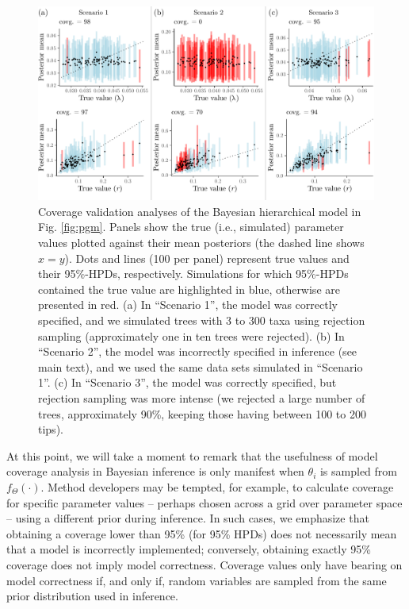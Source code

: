 \documentclass[oneside]{article}
\begin{document}
\begin{figure}
  \includegraphics[width=\textwidth]{../figures/graphical_model_coverage.pdf}
  \caption{
    Coverage validation analyses of the Bayesian hierarchical model in Fig. \ref{fig:pgm}.
    Panels show the true (i.e., simulated) parameter values plotted against their mean posteriors (the dashed line shows $x = y$).
    Dots and lines (100 per panel) represent true values and their 95\%-HPDs, respectively.
    Simulations for which 95\%-HPDs contained the true value are highlighted in blue, otherwise are presented in red.
    (a) In ``Scenario 1'', the model was correctly specified, and we simulated trees with 3 to 300 taxa using rejection sampling (approximately one in ten trees were rejected).
    (b) In ``Scenario 2'', the model was incorrectly specified in inference (see main text), and we used the same data sets simulated in ``Scenario 1''.
    (c) In ``Scenario 3'', the model was correctly specified, but rejection sampling was more intense (we rejected a large number of trees, approximately 90\%, keeping those having between 100 to 200 tips).
  }
  \label{fig:yulecalval}
\end{figure}

At this point, we will take a moment to remark that the usefulness of model coverage analysis in Bayesian inference is only manifest when $\theta_i$ is sampled from $f_\Theta(\cdot)$.
Method developers may be tempted, for example, to calculate coverage for specific parameter values -- perhaps chosen across a grid over parameter space -- using a different prior during inference.
In such cases, we emphasize that obtaining a coverage lower than 95\% (for 95\% HPDs) does not necessarily mean that a model is incorrectly implemented; conversely, obtaining exactly 95\% coverage does not imply model correctness.
Coverage values only have bearing on model correctness if, and only if, random variables are sampled from the same prior distribution used in inference. 
\end{document}
